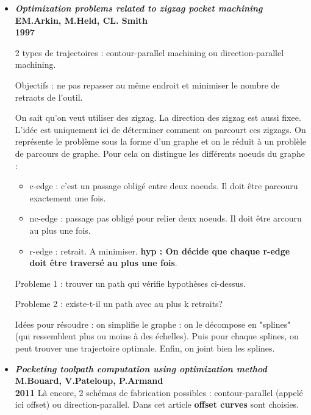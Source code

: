 \documentclass[11pt,a4paper]{article}
\begin{document}
\begin{itemize}
	\item \textbf{\emph{Optimization problems related to zigzag pocket machining} \\
		EM.Arkin, M.Held, CL. Smith \\
		1997}
	
		\vspace{0cm}
		
		2 types de trajectoires : contour-parallel machining ou direction-parallel machining. 
		
		\vspace{0cm}
		
		Objectifs : ne pas repasser au même endroit et minimiser le nombre de retraots de l'outil.
		
		\vspace{0cm}
		
		On sait qu'on veut utiliser des zigzag. La direction des zigzag est aussi fixee. L'idée est uniquement ici de déterminer comment on parcourt ces zigzags. On représente  le problème sous la forme d'un graphe et on le réduit à un problèle de parcours de graphe. Pour cela on distingue les différents noeuds du graphe :
		\begin{itemize}
			\item c-edge : c'est un passage obligé entre deux noeuds. Il doit être parcouru exactement une fois.
			\item nc-edge : passage pas obligé pour relier deux noeuds. Il doit être arcouru au plus une fois.
			\item r-edge : retrait. A minimiser. \textbf{hyp : On décide que chaque r-edge doit être traversé au plus une fois}.
		\end{itemize}	
		
		Probleme 1 : trouver un path qui vérifie hypothèses ci-dessus. 
		
		\vspace{0cm}
		
		Probleme 2 : existe-t-il un path avec au plus k retraits?
		
		\vspace{0cm}
		
		Idées pour résoudre : on simplifie le graphe : on le décompose en "splines" (qui ressemblent plus ou moins à des échelles). Puis pour chaque splines, on peut trouver une trajectoire optimale. Enfin, on joint bien les splines.
		
	
	\item \textbf{\emph{Pocketing toolpath computation using optimization method} \\
		M.Bouard, V.Pateloup, P.Armand \\
		2011}
		Là encore, 2 schémas de fabrication possibles : contour-parallel (appelé ici offset) ou direction-parallel. Dans cet article \textbf{offset curves} sont choisies.
		

\end{itemize}
\end{document}
